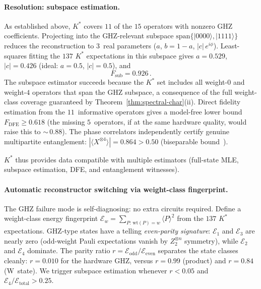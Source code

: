 \documentclass[twocolumn,prx,aps,superscriptaddress,longbibliography,floatfix]{revtex4-2}
\begin{document}
\paragraph{Resolution: subspace estimation.}
As established above, $K^*$ covers $11$ of the $15$ operators
with nonzero GHZ coefficients.
Projecting into the GHZ-relevant subspace
$\mathrm{span}\{|0000\rangle, |1111\rangle\}$ reduces the
reconstruction to $3$~real parameters ($a$, $b = 1 - a$,
$|c|\,e^{i\phi}$).  Least-squares fitting the $137$ $K^*$
expectations in this subspace gives
$a = 0.529$, $|c| = 0.426$ (ideal: $a = 0.5$, $|c| = 0.5$), and
\begin{equation}
  F_{\mathrm{sub}} = 0.926\,.
  \label{eq:ghz-sub}
\end{equation}
The subspace estimator succeeds because the $K^*$ set includes all
weight-$0$ and weight-$4$ operators that span the GHZ subspace, a
consequence of the full weight-class coverage guaranteed by
Theorem~\ref{thm:spectral-char}(ii).
Direct fidelity estimation from the $11$~informative operators gives
a model-free lower bound $F_{\mathrm{DFE}} \geq 0.618$ (the missing
$5$~operators, if at the same hardware quality, would raise this to
${\sim}\,0.88$).  The phase correlators independently certify genuine
multipartite entanglement:
$|\langle X^{\otimes 4}\rangle| = 0.864 > 0.50$ (biseparable
bound~\cite{TothGuhne2005}).

$K^*$ thus provides data compatible with multiple
estimators (full-state MLE, subspace estimation, DFE, and
entanglement witnesses).

\paragraph{Automatic reconstructor switching via weight-class fingerprint.}
The GHZ failure mode is self-diagnosing: no extra
circuits required.  Define a weight-class energy fingerprint
$\mathcal{E}_w = \sum_{P:\,\mathrm{wt}(P) = w} \langle P\rangle^2$
from the $137$ $K^*$ expectations.  GHZ-type states have a telling \emph{even-parity signature}:
$\mathcal{E}_1$ and $\mathcal{E}_3$ are nearly zero (odd-weight
Pauli expectations vanish by $Z_2^{\otimes n}$ symmetry), while
$\mathcal{E}_2$ and $\mathcal{E}_4$ dominate.  The parity ratio
$r = \mathcal{E}_{\mathrm{odd}} / \mathcal{E}_{\mathrm{even}}$ separates the
state classes cleanly: $r = 0.010$ for the hardware GHZ,
versus $r = 0.99$ (product) and $r = 0.84$ (W~state).
We trigger subspace estimation whenever $r < 0.05$ and
$\mathcal{E}_4 / \mathcal{E}_{\mathrm{total}} > 0.25$.
\end{document}
